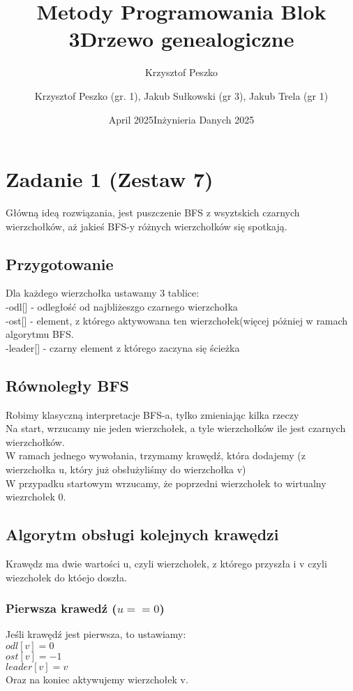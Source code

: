 \documentclass{article}
\title{Metody Programowania Blok 3}
\author{Krzysztof Peszko }
\date{April 2025}
\title{Drzewo genealogiczne}
\author{Krzysztof Peszko (gr. 1), 
Jakub Sułkowski (gr 3), Jakub Trela (gr 1)}
\date{Inżynieria Danych 2025}
\begin{document}
\maketitle

\section{Zadanie 1 (Zestaw 7)}
Główną ideą rozwiązania, jest puszczenie BFS z wsyztskich czarnych wierzchołków, aż jakieś BFS-y różnych wierzchołków się spotkają.
\subsection{ Przygotowanie}
Dla każdego wierzchołka ustawamy 3 tablice:
\\
-odl[] - odległość od najbliżeszgo czarnego wierzchołka
\\
-ost[] - element, z którego aktywowana ten wierzchołek(więcej póżniej w ramach algorytmu BFS.
\\
-leader[] - czarny element z którego zaczyna się ścieżka
\subsection{Równoległy BFS}
Robimy klasyczną interpretacje BFS-a, tylko zmieniając kilka rzeczy \\
Na start, wrzucamy nie jeden wierzchołek, a tyle wierzchołków ile jest czarnych wierzchołków. \\
W ramach jednego wywołania, trzymamy krawędź, która dodajemy (z wierzchołka u, który już obsłużyliśmy do wierzchołka v) \\
W przypadku startowym wrzucamy, że poprzedni wierzchołek to wirtualny wiezrchołek 0.
\subsection{Algorytm obsługi kolejnych krawędzi}
Krawędz ma dwie wartości u, czyli wierzchołek, z którego przyszła i v czyli wiezchołek do któejo doszła.
\subsubsection{Pierwsza krawedź ($u == 0$)}
Jeśli krawędź jest pierwsza, to ustawiamy: \\
$odl[v] = 0$ \\
$ost[v] = -1$ \\
$leader[v] = v$ \\
Oraz na koniec aktywujemy wierzchołek v.
\end{document}
